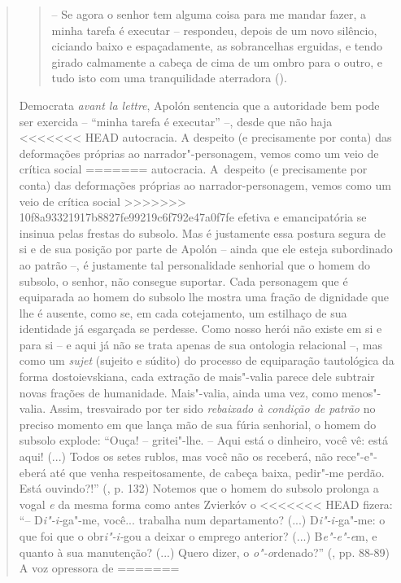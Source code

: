 {\begin{quote}
\begin{quote}
-- Se agora o senhor tem alguma coisa para me mandar fazer, a minha
tarefa é executar -- respondeu, depois de um novo silêncio, ciciando
baixo e espaçadamente, as sobrancelhas erguidas, e tendo girado
calmamente a cabeça de cima de um ombro para o outro, e tudo isto com
uma tranquilidade aterradora ().
\end{quote}

Democrata \emph{avant la lettre}, Apolón sentencia que a autoridade bem
pode ser exercida -- ``minha tarefa é executar'' --, desde que não haja
<<<<<<< HEAD
autocracia. A despeito (e precisamente por conta) das deformações
próprias ao narrador"-personagem, vemos como um veio de crítica social
=======
autocracia. A~despeito (e precisamente por conta) das deformações
próprias ao narrador-personagem, vemos como um veio de crítica social
>>>>>>> 10f8a93321917b8827fe99219c6f792e47a0f7fe
efetiva e emancipatória se insinua pelas frestas do subsolo. Mas é
justamente essa postura segura de si e de sua posição por parte de
Apolón -- ainda que ele esteja subordinado ao patrão --, é justamente
tal personalidade senhorial que o homem do subsolo, o senhor, não
consegue suportar. Cada personagem que é equiparada ao homem do subsolo
lhe mostra uma fração de dignidade que lhe é ausente, como se, em cada
cotejamento, um estilhaço de sua identidade já esgarçada se perdesse.
Como nosso herói não existe em si e para si -- e aqui já não se trata
apenas de sua ontologia relacional --, mas como um \emph{sujet} (sujeito
e súdito) do processo de equiparação tautológica da forma
dostoievskiana, cada extração de mais"-valia parece dele subtrair novas
frações de humanidade. Mais"-valia, ainda uma vez, como menos"-valia.
Assim, tresvairado por ter sido \emph{rebaixado à condição de patrão} no
preciso momento em que lança mão de sua fúria senhorial, o homem do
subsolo explode: ``Ouça! -- gritei"-lhe. -- Aqui está o dinheiro, você
vê: está aqui! (...) Todos os setes rublos, mas você não os receberá,
não rece"-e"-eberá até que venha respeitosamente, de cabeça baixa,
pedir"-me perdão. Está ouvindo?!'' (, p. 132) Notemos que o homem do
subsolo prolonga a vogal \emph{e} da mesma forma como antes Zvierkóv o
<<<<<<< HEAD
fizera: ``-- D\emph{i"-i-}ga"-me, você... trabalha num departamento? (...)
D\emph{i"-i-}ga"-me: o que foi que o obr\emph{i"-i-}gou a deixar o emprego
anterior? (...) B\emph{e"-e"-e}m, e quanto à sua manutenção? (...) Quero
dizer, o \emph{o"-o}rdenado?'' (, pp. 88-89) A voz opressora de
=======

\end{quote}}
